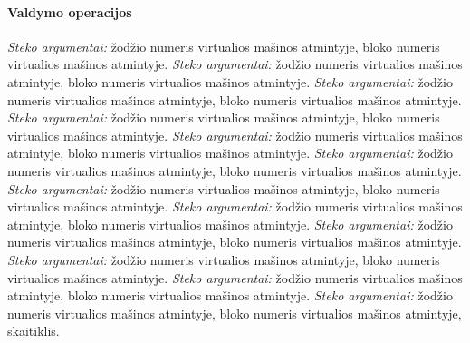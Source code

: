 \documentclass{scrartcl}
\begin{document}
                \paragraph{Valdymo operacijos}
                    \emph{Steko argumentai:} žodžio numeris virtualios mašinos atmintyje, bloko numeris virtualios mašinos atmintyje.
                    \emph{Steko argumentai:} žodžio numeris virtualios mašinos atmintyje, bloko numeris virtualios mašinos atmintyje.
                    \emph{Steko argumentai:} žodžio numeris virtualios mašinos atmintyje, bloko numeris virtualios mašinos atmintyje.
                    \emph{Steko argumentai:} žodžio numeris virtualios mašinos atmintyje, bloko numeris virtualios mašinos atmintyje.
                    \emph{Steko argumentai:} žodžio numeris virtualios mašinos atmintyje, bloko numeris virtualios mašinos atmintyje.
                    \emph{Steko argumentai:} žodžio numeris virtualios mašinos atmintyje, bloko numeris virtualios mašinos atmintyje.
                    \emph{Steko argumentai:} žodžio numeris virtualios mašinos atmintyje, bloko numeris virtualios mašinos atmintyje.
                    \emph{Steko argumentai:} žodžio numeris virtualios mašinos atmintyje, bloko numeris virtualios mašinos atmintyje.
                    \emph{Steko argumentai:} žodžio numeris virtualios mašinos atmintyje, bloko numeris virtualios mašinos atmintyje.
                    \emph{Steko argumentai:} žodžio numeris virtualios mašinos atmintyje, bloko numeris virtualios mašinos atmintyje.
                    \emph{Steko argumentai:} žodžio numeris virtualios mašinos atmintyje, bloko numeris virtualios mašinos atmintyje.
                    \emph{Steko argumentai:} žodžio numeris virtualios mašinos atmintyje, bloko numeris virtualios mašinos atmintyje, skaitiklis.
\end{document}
